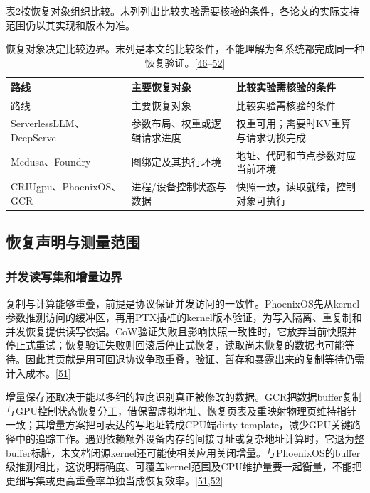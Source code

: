 \documentclass[
  UTF8,
  zihao=5]{ctexart}
\begin{document}
表2按恢复对象组织比较。末列列出比较实验需要核验的条件，各论文的实际支持范围仍以其实现和版本为准。

\begin{longtable}[]{@{}lll@{}}
\caption{恢复对象决定比较边界。末列是本文的比较条件，不能理解为各系统都完成同一种恢复验证。{[}\protect\hyperlink{ref-fu2024serverlessllm}{46}--\protect\hyperlink{ref-zeng2026gcr}{52}{]}}\tabularnewline
\toprule
路线 & 主要恢复对象 & 比较实验需核验的条件 \\
\midrule
\endfirsthead
\toprule
路线 & 主要恢复对象 & 比较实验需核验的条件 \\
\midrule
\endhead
ServerlessLLM、DeepServe & 参数布局、权重或逻辑请求进度 &
权重可用；需要时KV重算与请求切换完成 \\
Medusa、Foundry & 图绑定及其执行环境 &
地址、代码和节点参数对应当前环境 \\
CRIUgpu、PhoenixOS、GCR & 进程/设备控制状态与数据 &
快照一致，读取就绪，控制对象可执行 \\
\bottomrule
\end{longtable}

\hypertarget{ux6062ux590dux58f0ux660eux4e0eux6d4bux91cfux8303ux56f4}{%
\subsection{恢复声明与测量范围}\label{ux6062ux590dux58f0ux660eux4e0eux6d4bux91cfux8303ux56f4}}

\hypertarget{ux5e76ux53d1ux8bfbux5199ux96c6ux548cux589eux91cfux8fb9ux754c}{%
\subsubsection{并发读写集和增量边界}\label{ux5e76ux53d1ux8bfbux5199ux96c6ux548cux589eux91cfux8fb9ux754c}}

复制与计算能够重叠，前提是协议保证并发访问的一致性。PhoenixOS先从kernel参数推测访问的缓冲区，再用PTX插桩的kernel版本验证，为写入隔离、重复制和并发恢复提供读写依据。CoW验证失败且影响快照一致性时，它放弃当前快照并停止式重试；恢复验证失败则回滚后停止式恢复，读取尚未恢复的数据也可能等待。因此其贡献是用可回退协议争取重叠，验证、暂存和暴露出来的复制等待仍需计入成本。{[}\protect\hyperlink{ref-wei2025phoenixos}{51}{]}

增量保存还取决于能以多细的粒度识别真正被修改的数据。GCR把数据buffer复制与GPU控制状态恢复分工，借保留虚拟地址、恢复页表及重映射物理页维持指针一致；其增量方案把可表达的写地址转成CPU端dirty
template，减少GPU关键路径中的追踪工作。遇到依赖额外设备内存的间接寻址或复杂地址计算时，它退为整buffer标脏，未文档闭源kernel还可能使相关应用关闭增量。与PhoenixOS的buffer级推测相比，这说明精确度、可覆盖kernel范围及CPU维护量要一起衡量，不能把更细写集或更高重叠率单独当成恢复效率。{[}\protect\hyperlink{ref-wei2025phoenixos}{51},\protect\hyperlink{ref-zeng2026gcr}{52}{]}
\end{document}
